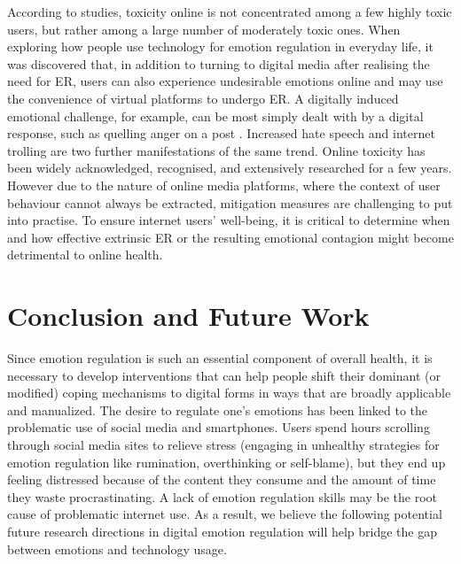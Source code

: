 \documentclass[lettersize,journal]{IEEEtran}
\begin{document}
According to studies, toxicity online is not concentrated among a few highly toxic users, but rather among a large number of moderately toxic ones. When exploring how people use technology for emotion regulation in everyday life, it was discovered that, in addition to turning to digital media after realising the need for ER, users can also experience undesirable emotions online and may use the convenience of virtual platforms to undergo ER. A digitally induced emotional challenge, for example, can be most simply dealt with by a digital response, such as quelling anger on a post \cite{smith2022digital}. Increased hate speech and internet trolling are two further manifestations of the same trend. Online toxicity has been widely acknowledged, recognised, and extensively researched for a few years. However due to the nature of online media platforms, where the context of user behaviour cannot always be extracted, mitigation measures are challenging to put into practise. To ensure internet users' well-being, it is critical to determine when and how effective extrinsic ER or the resulting emotional contagion might become detrimental to online health.





 




\section{Conclusion and Future Work}
Since emotion regulation is such an essential component of overall health, it is necessary to develop interventions that can help people shift their dominant (or modified) coping mechanisms to digital forms in ways that are broadly applicable and manualized. The desire to regulate one's emotions has been linked to the problematic use of social media and smartphones. Users spend hours scrolling through social media sites to relieve stress (engaging in unhealthy strategies for emotion regulation like rumination, overthinking or self-blame), but they end up feeling distressed because of the content they consume and the amount of time they waste procrastinating. A lack of emotion regulation skills may be the root cause of problematic internet use. As a result, we believe the following potential future research directions in digital emotion regulation will help bridge the gap between emotions and technology usage.
  
\end{document}
